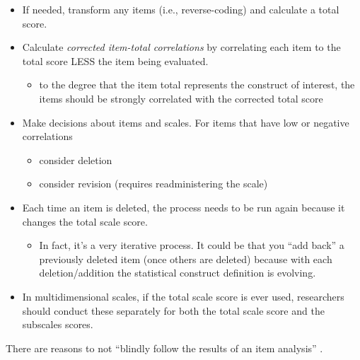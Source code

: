 \documentclass[
  english,
]{book}
\providecommand{\tightlist}{%
  \setlength{\itemsep}{0pt}\setlength{\parskip}{0pt}}
\begin{document}
\begin{itemize}
\tightlist
\item
  If needed, transform any items (i.e., reverse-coding) and calculate a total score.
\item
  Calculate \emph{corrected item-total correlations} by correlating each item to the total score LESS the item being evaluated.

  \begin{itemize}
  \tightlist
  \item
    to the degree that the item total represents the construct of interest, the items should be strongly correlated with the corrected total score
  \end{itemize}
\item
  Make decisions about items and scales. For items that have low or negative correlations

  \begin{itemize}
  \tightlist
  \item
    consider deletion
  \item
    consider revision (requires readministering the scale)
  \end{itemize}
\item
  Each time an item is deleted, the process needs to be run again because it changes the total scale score.

  \begin{itemize}
  \tightlist
  \item
    In fact, it's a very iterative process. It could be that you ``add back'' a previously deleted item (once others are deleted) because with each deletion/addition the statistical construct definition is evolving.
  \end{itemize}
\item
  In multidimensional scales, if the total scale score is ever used, researchers should conduct these separately for both the total scale score and the subscales scores.
\end{itemize}

There are reasons to not ``blindly follow the results of an item analysis'' \citep{green_using_2010}.
\end{document}
